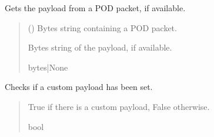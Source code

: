 \documentclass[letterpaper,10pt,english]{sphinxmanual}
\begin{document}
\begin{fulllineitems}
\begin{fulllineitems}
\end{fulllineitems}


\begin{fulllineitems}
\label{\detokenize{PodApi.Packets:PodApi.Packets.Standard.PacketStandard.GetPayload}}
\pysigstartsignatures
{}
\pysigstopsignatures
\sphinxAtStartPar
Gets the payload from a POD packet, if available.
\begin{quote}\begin{description}
\sphinxAtStartPar
{} () \textendash{} Bytes string containing a POD packet.

\sphinxAtStartPar
Bytes string of the payload, if available.

\sphinxAtStartPar
bytes|None

\end{description}\end{quote}

\end{fulllineitems}


\begin{fulllineitems}
\label{\detokenize{PodApi.Packets:PodApi.Packets.Standard.PacketStandard.HasCustomPayload}}
\pysigstartsignatures
{}
\pysigstopsignatures
\sphinxAtStartPar
Checks if a custom payload has been set.
\begin{quote}\begin{description}
\sphinxAtStartPar
True if there is a custom payload, False otherwise.

\sphinxAtStartPar
bool

\end{description}\end{quote}


\end{fulllineitems}
\end{fulllineitems}
\end{document}

